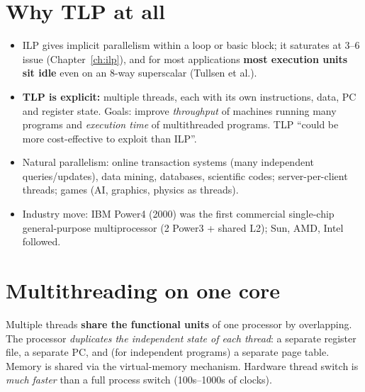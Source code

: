 \section{Why TLP at all}
\begin{itemize}
\item ILP gives implicit parallelism within a loop or basic block; it saturates at 3--6 issue (Chapter~\ref{ch:ilp}), and for most applications \textbf{most execution units sit idle} even on an 8-way superscalar (Tullsen et al.).
\item \textbf{TLP is explicit:} multiple threads, each with its own instructions, data, PC and register state. Goals: improve \emph{throughput} of machines running many programs and \emph{execution time} of multithreaded programs. TLP ``could be more cost-effective to exploit than ILP''.
\item Natural parallelism: online transaction systems (many independent queries/updates), data mining, databases, scientific codes; server-per-client threads; games (AI, graphics, physics as threads).
\item Industry move: IBM Power4 (2000) was the first commercial single-chip general-purpose multiprocessor (2 Power3 + shared L2); Sun, AMD, Intel followed.
\end{itemize}

\section{Multithreading on one core}
Multiple threads \textbf{share the functional units} of one processor by overlapping. The processor \emph{duplicates the independent state of each thread}: a separate register file, a separate PC, and (for independent programs) a separate page table. Memory is shared via the virtual-memory mechanism. Hardware thread switch is \emph{much faster} than a full process switch (100s--1000s of clocks).

